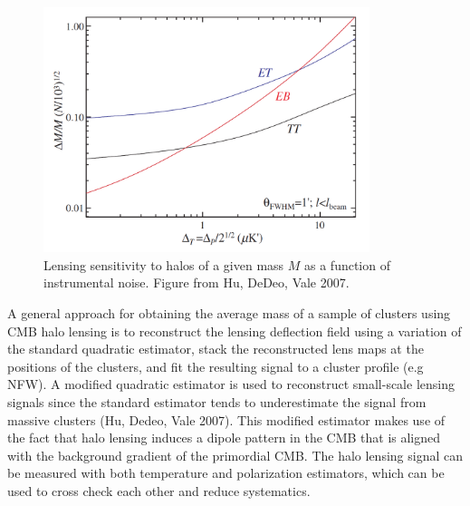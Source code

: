 \begin{figure}[ht]
\centering 
\includegraphics[width=0.85\textwidth]{CMBLensing/HaloLensing.png}
\caption{Lensing sensitivity to halos of a given mass $M$ as a function of instrumental noise.  Figure from Hu, DeDeo, Vale 2007.}
\label{haloLens}
\end{figure}

A general approach for obtaining the average mass of a sample of clusters using CMB halo lensing is to reconstruct the lensing deflection field using a variation of the standard quadratic estimator, stack the reconstructed lens maps at the positions of the clusters, and fit the resulting signal to a cluster profile (e.g NFW). A modified quadratic estimator is used to reconstruct small-scale lensing signals since the standard estimator tends to underestimate the signal from massive clusters (Hu, Dedeo, Vale 2007).  This modified estimator makes use of the fact that halo lensing induces a dipole pattern in the CMB that is aligned with the background gradient of the primordial CMB.  The halo lensing signal can be measured with both temperature and polarization estimators, which can be used to cross check each other and reduce systematics. 

